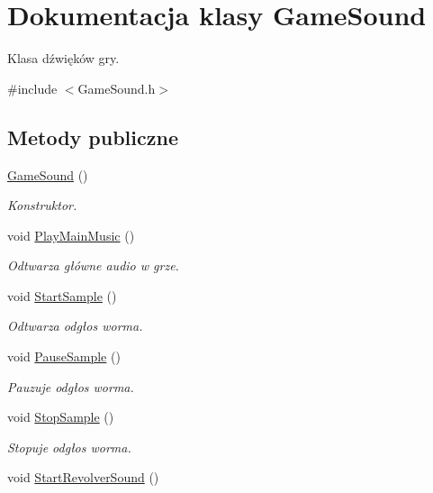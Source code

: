 \hypertarget{class_game_sound}{}\section{Dokumentacja klasy Game\+Sound}
\label{class_game_sound}


Klasa dźwięków gry.  




{\ttfamily \#include $<$Game\+Sound.\+h$>$}

\subsection*{Metody publiczne}
\begin{DoxyCompactItemize}
\item 
\mbox{\hyperlink{class_game_sound_a14feacd320c8a89e68cacf456920c8c1}{Game\+Sound}} ()
\begin{DoxyCompactList}\small\item\em Konstruktor. \end{DoxyCompactList}\item 
void \mbox{\hyperlink{class_game_sound_ad89f0cfad75194e895cb68437f9c231f}{Play\+Main\+Music}} ()
\begin{DoxyCompactList}\small\item\em Odtwarza główne audio w grze. \end{DoxyCompactList}\item 
void \mbox{\hyperlink{class_game_sound_a30db244babc1e4aa518bd56500cea028}{Start\+Sample}} ()
\begin{DoxyCompactList}\small\item\em Odtwarza odgłos worma. \end{DoxyCompactList}\item 
void \mbox{\hyperlink{class_game_sound_a9b64e35e47dd7f06876be460c9cbf67f}{Pause\+Sample}} ()
\begin{DoxyCompactList}\small\item\em Pauzuje odgłos worma. \end{DoxyCompactList}\item 
void \mbox{\hyperlink{class_game_sound_a819246ab2ca8154f7b8fa1b87cdd68ca}{Stop\+Sample}} ()
\begin{DoxyCompactList}\small\item\em Stopuje odgłos worma. \end{DoxyCompactList}\item 
void \mbox{\hyperlink{class_game_sound_a909e0c0bc44437ea2853e734ab548e5a}{Start\+Revolver\+Sound}} ()

\end{DoxyCompactItemize}
